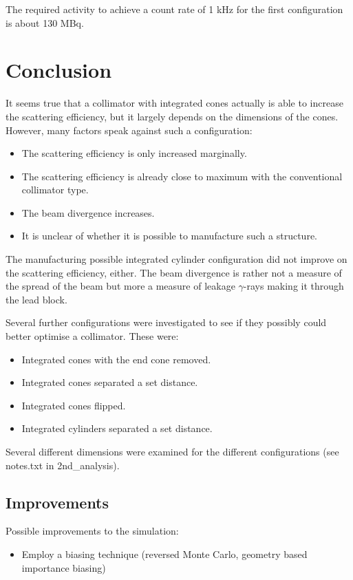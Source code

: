 \documentclass[a4paper]{article}
\begin{document}
The required activity to achieve a count rate of 1 kHz for the first configuration is about 130 MBq.


\section{Conclusion}
It seems true that a collimator with integrated cones actually is able to increase the scattering efficiency, but it largely depends on the dimensions of the cones. However, many factors speak against such a configuration:
\begin{itemize}
  \item The scattering efficiency is only increased marginally.
  \item The scattering efficiency is already close to maximum with the conventional collimator type.
  \item The beam divergence increases.
  \item It is unclear of whether it is possible to manufacture such a structure.
\end{itemize}
The manufacturing possible integrated cylinder configuration did not improve on the scattering efficiency, either.
The beam divergence is rather not a measure of the spread of the beam but more a measure of leakage $\gamma$-rays making it through the lead block.

Several further configurations were investigated to see if they possibly could better optimise a collimator. These were:
\begin{itemize}
  \item Integrated cones with the end cone removed.
  \item Integrated cones separated a set distance.
  \item Integrated cones flipped.
  \item Integrated cylinders separated a set distance.
\end{itemize}
Several different dimensions were examined for the different configurations (see notes.txt in 2nd\_analysis).

\subsection{Improvements}
Possible improvements to the simulation:
\begin{itemize}
  \item Employ a biasing technique (reversed Monte Carlo, geometry based importance biasing)
\end{itemize}
\end{document}
